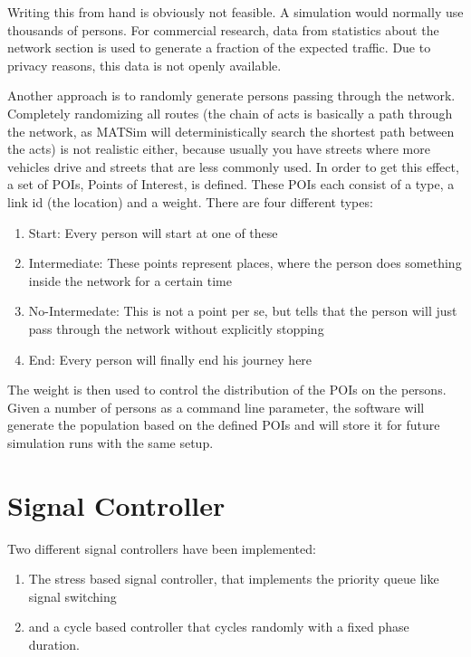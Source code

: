 Writing this from hand is obviously not feasible. A simulation would normally use thousands of persons. For commercial research, data from statistics about the network section is used to generate a fraction of the expected traffic. Due to privacy reasons, this data is not openly available.

Another approach is to randomly generate persons passing through the network. Completely randomizing all routes (the chain of acts is basically a path through the network, as MATSim will deterministically search the shortest path between the acts) is not realistic either, because usually you have streets where more vehicles drive and streets that are less commonly used. In order to get this effect, a set of POIs, Points of Interest, is defined. These POIs each consist of a type, a link id (the location) and a weight. There are four different types:

\begin{enumerate}
	\item Start: Every person will start at one of these
	\item Intermediate: These points represent places, where the person does something inside the network for a certain time
	\item No-Intermedate: This is not a point per se, but tells that the person will just pass through the network without explicitly stopping
	\item End: Every person will finally end his journey here
\end{enumerate}

The weight is then used to control the distribution of the POIs on the persons. Given a number of persons as a command line parameter, the software will generate the population based on the defined POIs and will store it for future simulation runs with the same setup.

\section{Signal Controller}

Two different signal controllers have been implemented:

\begin{enumerate}
	\item The stress based signal controller, that implements the priority queue like signal switching
	\item and a cycle based controller that cycles randomly with a fixed phase duration.
\end{enumerate}

